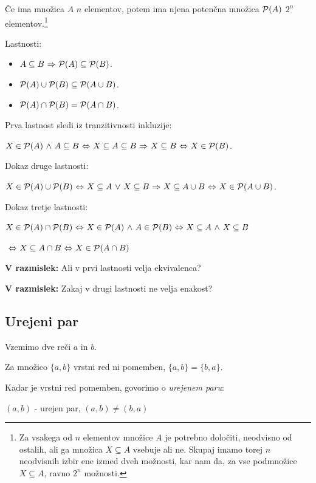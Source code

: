 \documentclass[11pt,paper=b5,footinclude,headinclude]{scrbook} %
\def\P {{\cal P}}
\def\ali {{~\vee~}}
\def\inn {{~\wedge~}}
\def\sledi {{~\Rightarrow~}}
\def\cee {{~\Leftrightarrow~}}
\begin{document}
Če ima množica $A$ $n$ elementov, potem ima njena potenčna množica ${\cal P}(A)$ $2^n$ elementov.\footnote{Za vsakega od $n$ elementov množice $A$ je potrebno določiti, neodvisno od ostalih, ali ga množica $X\subseteq A$ vsebuje ali ne. Skupaj imamo torej $n$ neodvisnih izbir ene izmed dveh možnosti, kar nam da, za vse podmnožice $X\subseteq A$, ravno $2^n$ možnosti.}

\bigskip
Lastnosti:
\begin{itemize}
  \item $A\subseteq B\sledi \P(A) \subseteq \P(B)$.
  \item $\P(A) \cup \P(B) \subseteq \P(A\cup B)$.
  \item $\P(A)\cap \P(B) =  \P(A\cap B)$.
\end{itemize}

Prva lastnost sledi iz tranzitivnosti inkluzije:

$X\in \P(A) \inn A\subseteq B\cee X\subseteq A\subseteq B\sledi X\subseteq B\cee X\in \P(B)$.

Dokaz druge lastnosti:

$X\in \P(A) \cup \P(B) \cee X\subseteq A\ali X\subseteq B\sledi X\subseteq A\cup B\cee X\in \P(A\cup B)$.


Dokaz tretje lastnosti:

$X\in \P(A)\cap \P(B)\cee X\in \P(A) \inn A\in \P(B)\cee X\subseteq A \inn X\subseteq B$

$\cee X\subseteq A \cap B\cee X\in \P(A\cap B)$

%

\medskip
\textbf{ V razmislek:} Ali v prvi lastnosti velja ekvivalenca?

\medskip
\textbf{ V razmislek:} Zakaj v drugi lastnosti ne velja enakost?


\subsection{Urejeni par}

Vzemimo dve reči $a$ in $b$.

Za množico $\{a,b\}$ vrstni red ni pomemben, $\{a,b\} = \{b,a\}$.

Kadar je vrstni red pomemben, govorimo o {\em urejenem paru}:

$(a,b)$ - urejen par, $(a,b)\neq (b,a)$
\end{document}
